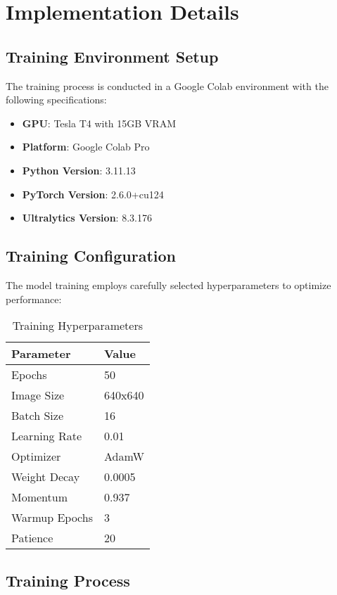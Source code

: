 \documentclass[12pt,a4paper]{article}
\begin{document}
\section{Implementation Details}

\subsection{Training Environment Setup}

The training process is conducted in a Google Colab environment with the following specifications:

\begin{itemize}
    \item \textbf{GPU}: Tesla T4 with 15GB VRAM
    \item \textbf{Platform}: Google Colab Pro
    \item \textbf{Python Version}: 3.11.13
    \item \textbf{PyTorch Version}: 2.6.0+cu124
    \item \textbf{Ultralytics Version}: 8.3.176
\end{itemize}

\subsection{Training Configuration}

The model training employs carefully selected hyperparameters to optimize performance:

\begin{table}[H]
\centering
\begin{tabular}{|l|l|}
\hline
\textbf{Parameter} & \textbf{Value} \\
\hline
Epochs & 50 \\
Image Size & 640x640 \\
Batch Size & 16 \\
Learning Rate & 0.01 \\
Optimizer & AdamW \\
Weight Decay & 0.0005 \\
Momentum & 0.937 \\
Warmup Epochs & 3 \\
Patience & 20 \\
\hline
\end{tabular}
\caption{Training Hyperparameters}
\end{table}

\subsection{Training Process}
\end{document}
